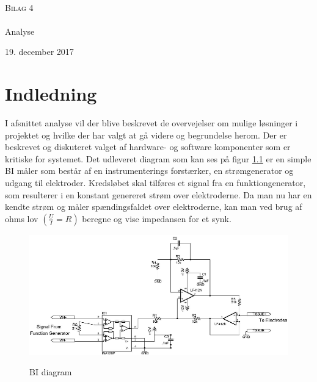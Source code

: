 



\begin{titlingpage}
\begin{center}

~ \\[3cm]


\textsc{\LARGE Bilag 4}\\[1.5cm]


\noindent\makebox[\linewidth]{\rule{\textwidth}{0.4pt}}\\
[0.5cm]{\Huge Analyse}
\noindent\makebox[\linewidth]{\rule{\textwidth}{0.4pt}}
\end{center}
\vfill
\begin{center}
{\large 19. december 2017}
\end{center}
\end{titlingpage}

\newpage
\tableofcontents*
\newpage

\chapter{Indledning}


I afsnittet analyse vil der blive beskrevet de overvejelser om mulige løsninger i projektet og hvilke der har valgt at gå videre og begrundelse herom. Der er beskrevet og diskuteret valget af hardware- og software komponenter som er kritiske for systemet. Det udleveret diagram som kan ses på figur \ref{fig:BIdiagram} er en simple BI måler som består af en instrumenterings forstærker, en strømgenerator og udgang til elektroder. Kredsløbet skal tilføres et signal fra en funktiongenerator, som resulterer i en konstant genereret strøm over elektroderne. Da man nu har en kendte strøm og måler spændingsfaldet over elektroderne, kan man ved brug af ohms lov $(\frac{U}{I}=R)$ beregne og vise impedansen for et synk.

\begin{figure}[H]
\centering
{\includegraphics[width=\linewidth]
{Figure/BIdiagram}}
\caption{BI diagram\cite{Aroom2009}}
\label{fig:BIdiagram}
\end{figure}






